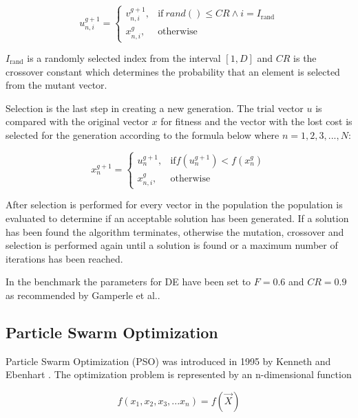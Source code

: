 \begin{equation}
    u_{n,i}^{g+1} =
    \begin{cases}
      v_{n,i}^{g+1}, & \text{if}\ rand() \leq CR \wedge i = I_{\text{rand}} \\
      x_{n,i}^{g}, & \text{otherwise}
\end{cases}
\end{equation}

$I_{\text{rand}}$ is a randomly selected index from the interval $[1,D]$ and $CR$ is the crossover constant which determines the probability that an element is selected from the mutant vector.

Selection is the last step in creating a new generation. The trial vector $u$ is compared with the original vector $x$ for fitness and the vector with the lost cost is selected for the generation according to the formula below where $n=1,2,3,...,N$:

\begin{equation}
    x_{n}^{g+1} =
    \begin{cases}
      u_{n}^{g+1}, & \text{if} f(u_{n}^{g+1}) < f(x_{n}^{g}) \\
      x_{n,i}^{g}, & \text{otherwise}
\end{cases}
\end{equation}

After selection is performed for every vector in the population the population is evaluated to determine if an acceptable solution has been generated. If a solution has been found the algorithm terminates, otherwise the mutation, crossover and selection is performed again until a solution is found or a maximum number of iterations has been reached.

In the benchmark the parameters for DE have been set to $F = 0.6$ and $CR=0.9$ as recommended by Gamperle et al.\cite{gamperle2002parameter}.

\subsection{Particle Swarm Optimization}

Particle Swarm Optimization (PSO) \cite{Das2008} was introduced in 1995 by Kenneth and Ebenhart \cite{eberhart1995new}. The optimization problem is represented by an n-dimensional function

\begin{equation}
  f(x_1,x_2,x_3,...x_n) = f(\vec{X})
\end{equation}


